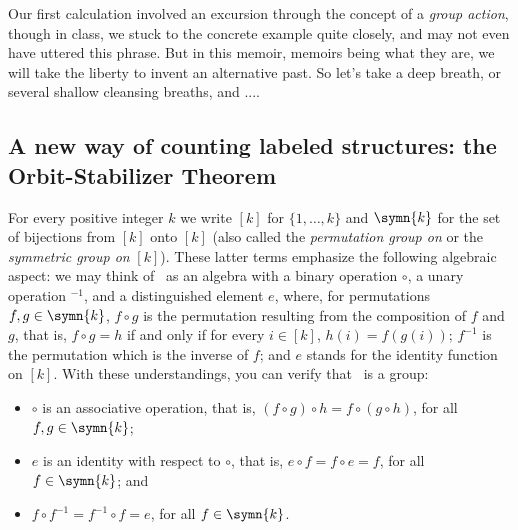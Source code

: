 Our first calculation involved an excursion through the concept of a \emph{group action}, though in class, we stuck to the concrete example quite closely, and may not even have uttered this phrase. But in this memoir, memoirs being what they are, we will take the liberty to invent an alternative past. So let's take a deep breath, or several shallow cleansing breaths, and ....
\fi
\subsection{A new way of counting labeled structures: the Orbit-Stabilizer Theorem}

For every positive integer $k$ we write $[k]$ for $\{1,\ldots,k\}$ and $\symn{k}$ for the set of bijections from $[k]$ onto $[k]$ (also called the \emph{permutation group on} or the \emph{symmetric group on} $[k]$). These latter terms emphasize the following algebraic aspect: we may think of \ as an algebra with a binary operation $\circ$, a unary operation $^{-1}$, and a distinguished element $e$, where, for permutations $f,g\in\symn{k}$, $f\circ g$ is the permutation resulting from the composition of $f$ and $g$, that is, $f\circ g =h$ if and only if for every $i\in [k]$, $h(i) = f(g(i))$; $f^{-1}$ is the permutation which is the inverse of $f$; and $e$ stands for the identity function on $[k]$. With these understandings, you can verify that \ is a group: 
\begin{itemize}
\item   
$\circ$ is an associative operation, that is, $(f\circ g)\circ h= f\circ (g\circ h)$, for all $f,g\in\symn{k}$;
\item
 $e$ is an identity with respect to $\circ$, that is, $e\circ f = f\circ e = f$, for all $f\in\symn{k}$; and 
 \item
 $f\circ f^{-1} = f^{-1}\circ f = e$, for all $f\in\symn{k}$.
\end{itemize} 

